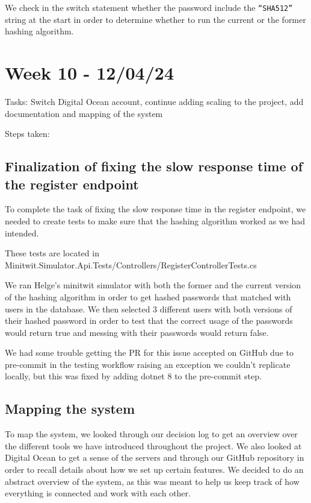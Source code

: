 We check in the switch statement whether the password include the \texttt{“SHA512”} string at the start in order to determine whether to run the current or the former hashing algorithm.

\section{Week 10 - 12/04/24}
\label{log:week10}

Tasks: Switch Digital Ocean account, continue adding scaling to the project, add documentation and mapping of the system

Steps taken:

\subsection{Finalization of fixing the slow response time of the register endpoint}
\label{log:finalization-of-fixing-the-slow-response-time-of-the-register-endpoint}

To complete the task of fixing the slow response time in the register endpoint, we needed to create tests to make sure that the hashing algorithm worked as we had intended.

These tests are located in Minitwit.Simulator.Api.Tests/Controllers/RegisterControllerTests.cs

We ran Helge's minitwit simulator with both the former and the current version of the hashing algorithm in order to get hashed passwords that matched with users in the database. We then selected 3 different users with both versions of their hashed password in order to test that the correct usage of the passwords would return true and messing with their passwords would return false.

We had some trouble getting the PR for this issue accepted on GitHub due to pre-commit in the testing workflow raising an exception we couldn't replicate locally, but this was fixed by adding dotnet 8 to the pre-commit step.

\subsection{Mapping the system}
\label{log:mapping-the-system}

To map the system, we looked through our decision log to get an overview over the different tools we have introduced throughout the project. We also looked at Digital Ocean to get a sense of the servers and through our GitHub repository in order to recall details about how we set up certain features. We decided to do an abstract overview of the system, as this was meant to help us keep track of how everything is connected and work with each other.

